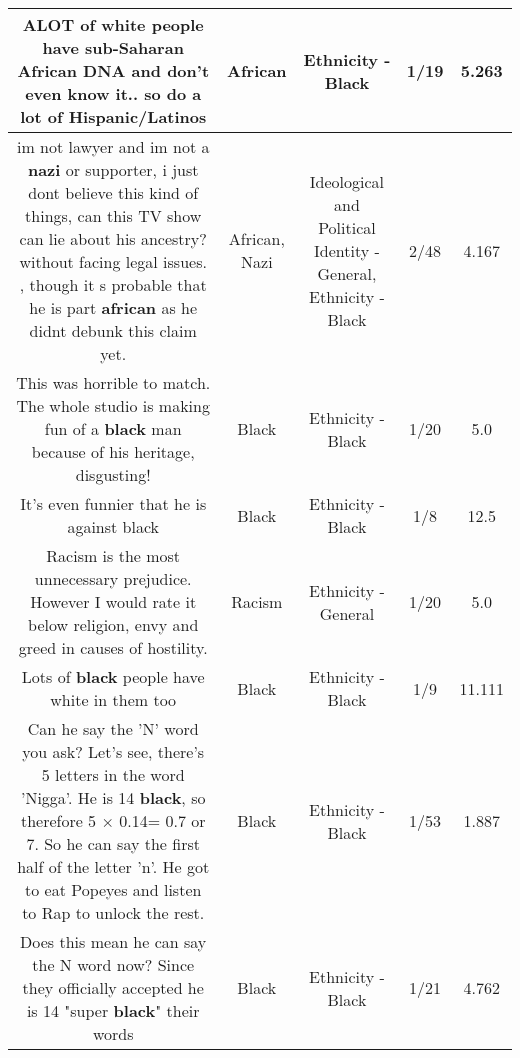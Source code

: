 \documentclass[11pt]{article}
\newlength\mylength
\begin{document}
\begin{center}
\begin{longtable}{|C{.65\mylength}|C{.30\mylength}|C{.12\mylength}|C{.12\mylength}|C{.12\mylength}|}
  \small ALOT of white people have sub-Saharan \textbf{African} DNA and don't even know it.. so do a lot of Hispanic/Latinos\normalsize   & African & Ethnicity - Black & 1/19 & 5.263 \\  \hline
  \small im not lawyer and im not a \textbf{nazi} or supporter, i just dont believe this kind of things, can this TV show can lie about his ancestry?  without facing legal issues. , though it s probable that he is part \textbf{african} as he didnt debunk this claim yet.\normalsize   & African, Nazi &  Ideological and Political Identity - General, Ethnicity - Black & 2/48 & 4.167 \\  \hline
  \small This was horrible to match. The whole studio is making fun of a \textbf{black} man because of his heritage, disgusting!\normalsize   & Black & Ethnicity - Black & 1/20 & 5.0 \\  \hline
  \small It's even funnier that he is against black\normalsize   & Black & Ethnicity - Black & 1/8 & 12.5 \\  \hline
  \small Racism is the most unnecessary prejudice. However I would rate it below religion, envy and greed in causes of hostility.\normalsize   & Racism & Ethnicity - General & 1/20 & 5.0 \\  \hline
  \small Lots of \textbf{black} people have white in them too\normalsize   & Black & Ethnicity - Black & 1/9 & 11.111 \\  \hline
  \small Can he say the 'N' word you ask? Let's see, there's 5 letters in the word 'Nigga'. He is 14 \textbf{black}, so therefore 5 × 0.14= 0.7 or 7. So he can say the first half of the letter 'n'. He got to eat Popeyes and listen to Rap to unlock the rest.\normalsize   & Black & Ethnicity - Black & 1/53 & 1.887 \\  \hline
  \small Does this mean he can say the N word now? Since they officially accepted he is 14 "super \textbf{black}" their words\normalsize   & Black & Ethnicity - Black & 1/21 & 4.762 \\  \hline

\end{longtable}
\end{center}
\end{document}
